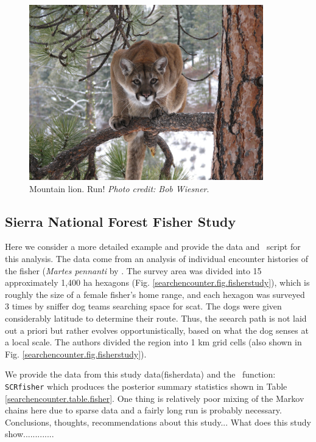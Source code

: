 \begin{figure}
\centering
\includegraphics[height=3in]{Ch15-searchencounter/figs/mountain_lion.jpg}
\caption{
Mountain lion.
Run!
{\it Photo credit: Bob Wiesner}.
}
\label{searchencounter.fig.lion}
\end{figure}

\subsection{Sierra National Forest Fisher Study}

Here we consider a more detailed example and provide the data and
\R~script for this analysis.  The data come from an analysis of
individual encounter histories of the fisher ({\it Martes pennanti} by
\citet{thompson_etal:2012}.  The survey area was divided into 15
approximately 1,400 ha hexagons
(Fig. \ref{searchencounter.fig.fisherstudy}), which is roughly the
size of a female fisher's home range, and each hexagon was surveyed 3
times by sniffer dog teams searching space for scat. The dogs were
given considerably latitude to determine their route.  Thus, the
seearch path is not laid out a priori but rather evolves
opportunistically, based on what the dog senses at a local scale.  The
authors divided the region into 1 km grid cells (also shown in Fig.
\ref{searchencounter.fig.fisherstudy}).

We provide the
data from this study
data(fisherdata) and the
\R~function: \mbox{\tt SCRfisher} which produces the posterior summary
statistics shown in Table
\ref{searchencounter.table.fisher}.
One thing is relatively poor mixing of the Markov chains here due to
sparse data and a fairly long run is probably necessary.
Conclusions, thoughts, recommendations about this study...
What does this study show.............


